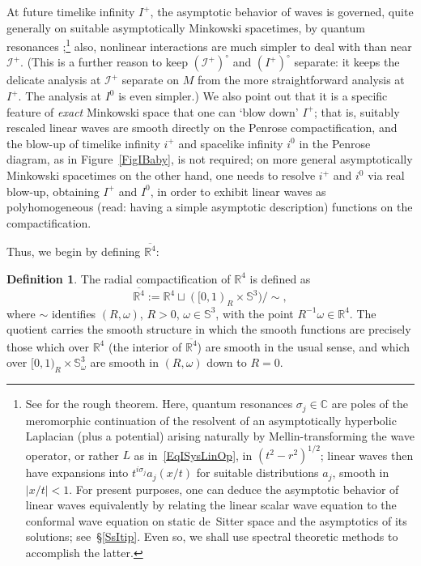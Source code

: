 \documentclass[reqno,11pt,letterpaper]{amsart}
\numberwithin{equation}{section}
\numberwithin{figure}{section}
\theoremstyle{definition}
\newtheorem{definition}[thm]{Definition}
\theoremstyle{remark}
\newcommand{\ms}{\mathscr}
\newcommand{\scri}{\ms I}
\newcommand{\C}{\mathbb{C}}
\newcommand{\R}{\mathbb{R}}
\newcommand{\Sph}{\mathbb{S}}
\newcommand{\ol}{\overline}
\begin{document}
At future timelike infinity $I^+$, the asymptotic behavior of waves is governed, quite generally on suitable asymptotically Minkowski spacetimes, by quantum resonances \cite{BaskinVasyWunschRadMink};\footnote{See \cite[Theorem~1.1]{BaskinVasyWunschRadMink} for the rough theorem. Here, quantum resonances $\sigma_j\in\C$ are poles of the meromorphic continuation of the resolvent of an asymptotically hyperbolic Laplacian (plus a potential) arising naturally by Mellin-transforming the wave operator, or rather $L$ as in~\eqref{EqISysLinOp}, in $(t^2-r^2)^{1/2}$; linear waves then have expansions into $t^{i\sigma_j}a_j(x/t)$ for suitable distributions $a_j$, smooth in $|x/t|<1$. For present purposes, one can deduce the asymptotic behavior of linear waves equivalently by relating the linear scalar wave equation to the conformal wave equation on static de~Sitter space and the asymptotics of its solutions; see~\S\ref{SsItip}. Even so, we shall use spectral theoretic methods to accomplish the latter.} also, nonlinear interactions are much simpler to deal with than near $\scri^+$. (This is a further reason to keep $(\scri^+)^\circ$ and $(I^+)^\circ$ separate: it keeps the delicate analysis at $\scri^+$ separate on $M$ from the more straightforward analysis at $I^+$. The analysis at $I^0$ is even simpler.) We also point out that it is a specific feature of \emph{exact} Minkowski space that one can `blow down' $I^+$; that is, suitably rescaled linear waves are smooth directly on the Penrose compactification, and the blow-up of timelike infinity $i^+$ and spacelike infinity $i^0$ in the Penrose diagram, as in Figure~\ref{FigIBaby}, is not required; on more general asymptotically Minkowski spacetimes on the other hand, one needs to resolve $i^+$ and $i^0$ via real blow-up, obtaining $I^+$ and $I^0$, in order to exhibit linear waves as polyhomogeneous (read: having a simple asymptotic description) functions on the compactification.

Thus, we begin by defining $\ol{\R^4}$:
\begin{definition}
\label{DefISysLinCpt}
  The radial compactification of $\R^4$ is defined as
  \begin{equation}
  \label{EqISysLinCpt}
    \ol{\R^4}:=\R^4\sqcup([0,1)_R\times\Sph^3)/\sim,
  \end{equation}
  where $\sim$ identifies $(R,\omega)$, $R>0$, $\omega\in\Sph^3$, with the point $R^{-1}\omega\in\R^4$. The quotient carries the smooth structure in which the smooth functions are precisely those which over $\R^4$ (the interior of $\ol{\R^4}$) are smooth in the usual sense, and which over $[0,1)_R\times\Sph^3_\omega$ are smooth in $(R,\omega)$ down to $R=0$.
\end{definition}
\end{document}

